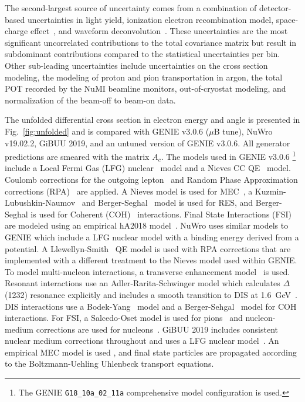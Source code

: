 \documentclass[%
twocolumn,
superscriptaddress,
showpacs,preprintnumbers,
amsmath,amssymb,
aps,
prl,
longbibliography
]{revtex4-1}
\begin{document}
The second-largest source of uncertainty comes from a combination of detector-based uncertainties in light yield, ionization electron  recombination model, space-charge effect~\cite{Abratenko_2020bbx}, and waveform deconvolution~\cite{microboonecollaboration2021novel}. These uncertainties are the most significant uncorrelated contributions to the total covariance matrix but result in subdominant contributions compared to the statistical uncertainties per bin. Other sub-leading uncertainties include uncertainties on the cross section modeling, the modeling of proton and pion transportation in argon, the total POT recorded by the NuMI beamline monitors, out-of-cryostat modeling, and normalization of the beam-off to beam-on data.

The unfolded differential cross section in electron energy and angle is presented in Fig.~\ref{fig:unfolded} and is compared with GENIE v3.0.6 ($\mu$B tune), NuWro v19.02.2, GiBUU 2019, and an untuned version of GENIE v3.0.6. All generator predictions are smeared with the matrix $A_c$. The models used in GENIE v3.0.6 \footnote{The GENIE \texttt{G18\_10a\_02\_11a} comprehensive model configuration is used.} include a Local Fermi Gas (LFG) nuclear~\cite{CARRASCO1992445} model and a Nieves CC QE~\cite{PhysRevD.85.113008} model. Coulomb corrections for the outgoing lepton~\cite{PhysRevC.57.2004} and Random Phase Approximation corrections (RPA)~\cite{PhysRevC.70.055503} are applied. A Nieves model is used for MEC~\cite{schwehr2017genie}, a Kuzmin-Lubushkin-Naumov~\cite{KLN} and Berger-Seghal~\cite{Minibooneq2,PhysRevD.76.113004} model is used for RES, and Berger-Seghal is used for Coherent (COH)~\cite{PhysRevD.79.053003} interactions. Final State Interactions (FSI) are modeled using an empirical hA2018 model~\cite{PhysRevC.23.2173}. NuWro uses similar models to GENIE which include a LFG nuclear model with a binding energy derived from a potential. A Llewellyn-Smith~\cite{LLEWELLYNSMITH1972261} QE model is used with RPA corrections that are implemented with a different treatment to the Nieves model used within GENIE. To model multi-nucleon interactions, a transverse enhancement model~\cite{Eur.Phy.JC71.1726} is used. Resonant interactions use an Adler-Rarita-Schwinger model which calculates $\Delta$(1232) resonance explicitly and includes a smooth transition to DIS at 1.6~GeV~\cite{Sobczyk:2004va}. DIS interactions use a Bodek-Yang~\cite{Bodek_2003,Yang_2000} model and a Berger-Sehgal~\cite{PhysRevD.79.053003} model for COH interactions. For FSI, a Salcedo-Oset model is used for pions~\cite{SALCEDO1988557} and nucleon-medium corrections are used for nucleons~\cite{PhysRevC.45.791}. GiBUU 2019 \cite{Buss_2012} includes consistent nuclear medium corrections throughout and uses a LFG nuclear model~\cite{CARRASCO1992445}. An empirical MEC model is used \cite{PhysRevC.94.035502}, and final state particles are propagated according to the Boltzmann-Uehling Uhlenbeck transport equations.
\end{document}
